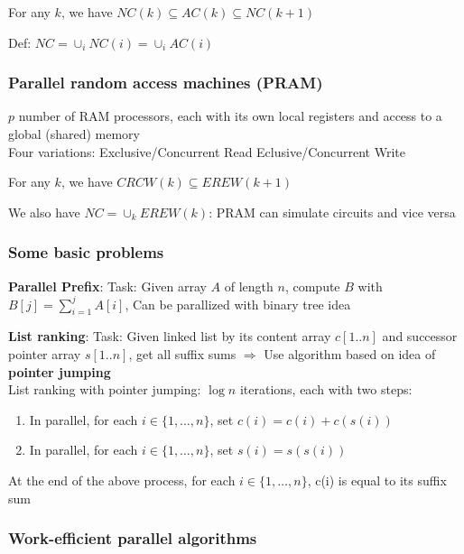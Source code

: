 \begin{lemma}
    For any $k$, we have $NC(k) \subseteq AC(k) \subseteq NC(k+1)$   
\end{lemma}
Def: $NC = \cup_i NC(i) = \cup_i AC(i)$

\subsubsection{Parallel random access machines (PRAM)}

$p$ number of RAM processors, each with its own local registers and access to a global (shared) memory \\
Four variations: Exclusive/Concurrent Read Eclusive/Concurrent Write

\begin{lemma}
    For any $k$, we have $CRCW(k) \subseteq EREW(k+1)$
\end{lemma}
We also have $NC=\cup_k EREW(k)$: PRAM can simulate circuits and vice versa

\subsubsection{Some basic problems}

\textbf{Parallel Prefix}: Task: Given array $A$ of length $n$, compute $B$ with $B[j]= \sum_{i=1}^j A[i]$, Can be parallized with binary tree idea

\textbf{List ranking}: Task: Given linked list by its content array $c[1..n]$ and successor pointer array $s[1..n]$, get all suffix sums $\Rightarrow$ Use algorithm based on idea of \textbf{pointer jumping} \\
List ranking with pointer jumping: $\log n$ iterations, each with two steps:
\begin{enumerate}
    \item In parallel, for each $i\in \{1,\dots, n\}$, set $c(i) = c(i) + c(s(i))$
    \item In parallel, for each $i\in \{1,\dots, n\}$, set $s(i)=s(s(i))$
\end{enumerate}

\begin{lemma}
    At the end of the above process, for each $i\in \{1,\dots, n\}$, c(i) is equal to its suffix sum
\end{lemma}

\subsubsection{Work-efficient parallel algorithms}

